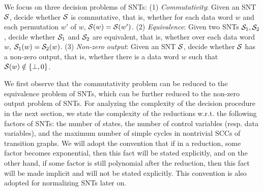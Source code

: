 %
%
%




We focus on three decision problems of SNTs: (1) \emph{Commutativity}: Given an SNT ${\mathcal{S} }$, decide whether ${\mathcal{S} }$ is commutative, that is, whether for each data word $w$ and each permutation $w'$ of $w$, ${\mathcal{S} }(w)={\mathcal{S} }(w')$. (2) \emph{Equivalence}: Given two SNTs ${\mathcal{S} }_1,{\mathcal{S} }_2$, decide whether ${\mathcal{S} }_1$ and ${\mathcal{S} }_2$ are equivalent, that is, whether over each data word $w$, ${\mathcal{S} }_1(w)={\mathcal{S} }_2(w)$. (3) \emph{Non-zero output}: Given an SNT ${\mathcal{S} }$, decide whether ${\mathcal{S} }$ has a non-zero output, that is, whether there is a data word $w$ such that ${\mathcal{S} }(w)\notin \{\bot, 0\}$. 

We first observe that the commutativity problem can be reduced to the equivalence problem of SNTs, which can be further reduced to the non-zero output problem of SNTs. For analyzing the complexity of the decision procedure in the next section,  we state the complexity of the reductions w.r.t. the following factors of SNTs: the number of states, the number of control variables (resp. data variables), and the maximum number of simple cycles in nontrivial SCCs of transition graphs. We will adopt the convention that if in a reduction, some factor becomes exponential, then this fact will be stated explicitly, and on the other hand, if some factor is still polynomial after the reduction, then this fact will be made implicit and will not be stated explicitly. This convention is also adopted for normalizing SNTs later on.

